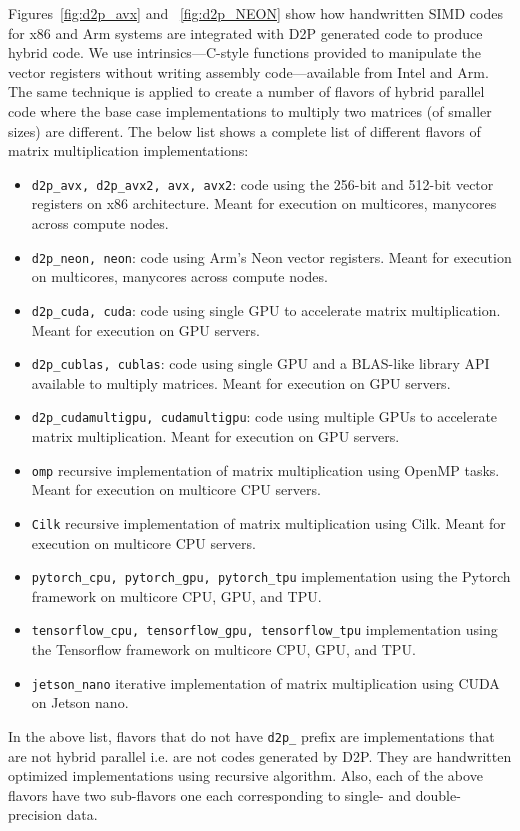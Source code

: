 Figures~\ref{fig:d2p_avx} and ~\ref{fig:d2p_NEON} show how handwritten SIMD codes for x86 and Arm systems are integrated with D2P generated code to produce hybrid code. We use intrinsics---C-style functions provided to manipulate the vector registers without writing assembly code---available from Intel and Arm. The same technique is applied to create a number of flavors of hybrid parallel code where the base case implementations to multiply two matrices (of smaller sizes) are different. The below list shows a complete list of different flavors of matrix multiplication implementations:
\begin{itemize}
\item \texttt{d2p\_avx, d2p\_avx2, avx, avx2}: code using the 256-bit and 512-bit vector registers on x86 architecture. Meant for execution on multicores, manycores across compute nodes.
\item \texttt{d2p\_neon, neon}: code using Arm's Neon vector registers. Meant for execution on multicores, manycores across compute nodes.
\item \texttt{d2p\_cuda, cuda}: code using single GPU to accelerate matrix multiplication. Meant for execution on GPU servers.
\item \texttt{d2p\_cublas, cublas}: code using single GPU and a BLAS-like library API available to multiply matrices. Meant for execution on GPU servers.
\item \texttt{d2p\_cudamultigpu, cudamultigpu}: code using multiple GPUs to accelerate matrix multiplication. Meant for execution on GPU servers.
\item \texttt{omp} recursive implementation of matrix multiplication using OpenMP tasks. Meant for execution on multicore CPU servers.
\item \texttt{Cilk} recursive implementation of matrix multiplication using Cilk. Meant for execution on multicore CPU servers.
\item \texttt{pytorch\_cpu, pytorch\_gpu, pytorch\_tpu} implementation using the Pytorch framework on multicore CPU, GPU, and TPU.
\item \texttt{tensorflow\_cpu, tensorflow\_gpu, tensorflow\_tpu} implementation using the Tensorflow framework on multicore CPU, GPU, and TPU.
\item \texttt{jetson\_nano} iterative implementation of matrix multiplication using CUDA on Jetson nano.
\end{itemize}

In the above list, flavors that do not have \texttt{d2p\_} prefix are implementations that are not hybrid parallel i.e. are not codes generated by D2P. They are handwritten optimized implementations using recursive algorithm.  Also, each of the above flavors have two sub-flavors one each corresponding to single- and double-precision data. 

